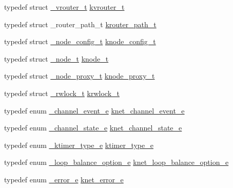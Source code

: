 \begin{DoxyCompactItemize}
typedef struct \hyperlink{a00050}{\+\_\+vrouter\+\_\+t} \hyperlink{a00066_a9863a6202df1fb40e2b32c673ad93267_a9863a6202df1fb40e2b32c673ad93267}{kvrouter\+\_\+t}
\item 
typedef struct \+\_\+router\+\_\+path\+\_\+t \hyperlink{a00066_aa5d1b6283a02b9e8d64da3bdef0eb04c_aa5d1b6283a02b9e8d64da3bdef0eb04c}{krouter\+\_\+path\+\_\+t}
\item 
typedef struct \hyperlink{a00034}{\+\_\+node\+\_\+config\+\_\+t} \hyperlink{a00066_af1cfaee0eb1c76ebf06076b95cc47ee1_af1cfaee0eb1c76ebf06076b95cc47ee1}{knode\+\_\+config\+\_\+t}
\item 
typedef struct \hyperlink{a00042}{\+\_\+node\+\_\+t} \hyperlink{a00066_a5e720b27efbc9ad744240f5f4233763a_a5e720b27efbc9ad744240f5f4233763a}{knode\+\_\+t}
\item 
typedef struct \hyperlink{a00040}{\+\_\+node\+\_\+proxy\+\_\+t} \hyperlink{a00066_a5025c3e4422f5f55b981aad6e56b6d89_a5025c3e4422f5f55b981aad6e56b6d89}{knode\+\_\+proxy\+\_\+t}
\item 
typedef struct \hyperlink{a00044}{\+\_\+rwlock\+\_\+t} \hyperlink{a00066_a95d7b2a7caea750fda47edc638788908_a95d7b2a7caea750fda47edc638788908}{krwlock\+\_\+t}
\item 
typedef enum \hyperlink{a00066_a1460362ccf3a6ba930a1a3ac2f73f3ea_a1460362ccf3a6ba930a1a3ac2f73f3ea}{\+\_\+channel\+\_\+event\+\_\+e} \hyperlink{a00066_accd62b4c787cfb91e81aa14210302863_accd62b4c787cfb91e81aa14210302863}{knet\+\_\+channel\+\_\+event\+\_\+e}
\item 
typedef enum \hyperlink{a00066_a18bbc160902cdba0f52f5a3cd879b47f_a18bbc160902cdba0f52f5a3cd879b47f}{\+\_\+channel\+\_\+state\+\_\+e} \hyperlink{a00066_a74ff83eaafca5c7093accdc65c6b0646_a74ff83eaafca5c7093accdc65c6b0646}{knet\+\_\+channel\+\_\+state\+\_\+e}
\item 
typedef enum \hyperlink{a00066_a7945681f6589a5f4f6cf55f4f4092d28_a7945681f6589a5f4f6cf55f4f4092d28}{\+\_\+ktimer\+\_\+type\+\_\+e} \hyperlink{a00066_a42e924130e6eb3bd995344f6d3f3e918_a42e924130e6eb3bd995344f6d3f3e918}{ktimer\+\_\+type\+\_\+e}
\item 
typedef enum \hyperlink{a00066_a0f82b35b603ffed92ea1a74205f10781_a0f82b35b603ffed92ea1a74205f10781}{\+\_\+loop\+\_\+balance\+\_\+option\+\_\+e} \hyperlink{a00066_aa131da8fb72468b39b6ee0e2d46b17b2_aa131da8fb72468b39b6ee0e2d46b17b2}{knet\+\_\+loop\+\_\+balance\+\_\+option\+\_\+e}
\item 
typedef enum \hyperlink{a00066_ad8bc998d415be9115a064a8307df0ed5_ad8bc998d415be9115a064a8307df0ed5}{\+\_\+error\+\_\+e} \hyperlink{a00066_abc9a047a9545c201adf70e4793ed0689_abc9a047a9545c201adf70e4793ed0689}{knet\+\_\+error\+\_\+e}

\end{DoxyCompactItemize}
